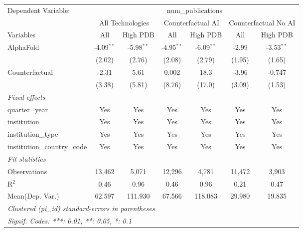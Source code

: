\begingroup
\centering
\begin{tabular}{lcccccc}
   \tabularnewline \midrule \midrule
   Dependent Variable: & \multicolumn{6}{c}{num\_publications}\\
 & \multicolumn{2}{c}{All Technologies} & \multicolumn{2}{c}{Counterfactual AI} & \multicolumn{2}{c}{Counterfactual No AI} \\
\cmidrule(lr){1-1}\cmidrule(lr){2-3} \cmidrule(lr){4-5} \cmidrule(lr){6-7}
Variables & \multicolumn{1}{c}{All} & \multicolumn{1}{c}{High PDB} & \multicolumn{1}{c}{All} & \multicolumn{1}{c}{High PDB} & \multicolumn{1}{c}{All} & \multicolumn{1}{c}{High PDB} \\
\cmidrule(lr){1-1}\cmidrule(lr){2-2} \cmidrule(lr){3-3} \cmidrule(lr){4-4} \cmidrule(lr){5-5} \cmidrule(lr){6-6} \cmidrule(lr){7-7}
   AlphaFold                    & -4.09$^{**}$ & -5.98$^{**}$ & -4.95$^{**}$ & -6.09$^{**}$ & -2.99  & -3.53$^{**}$\\   
                                & (2.02)       & (2.76)       & (2.08)       & (2.79)       & (1.95) & (1.65)\\   
   Counterfactual               & -2.31        & 5.61         & 0.002        & 18.3         & -3.96  & -0.747\\   
                                & (3.38)       & (5.81)       & (8.76)       & (17.0)       & (3.09) & (1.53)\\   
   \midrule
   \emph{Fixed-effects}\\
   quarter\_year                & Yes          & Yes          & Yes          & Yes          & Yes    & Yes\\  
   institution                  & Yes          & Yes          & Yes          & Yes          & Yes    & Yes\\  
   institution\_type            & Yes          & Yes          & Yes          & Yes          & Yes    & Yes\\  
   institution\_country\_code   & Yes          & Yes          & Yes          & Yes          & Yes    & Yes\\  
   \midrule
   \emph{Fit statistics}\\
   Observations                 & 13,462       & 5,071        & 12,296       & 4,781        & 11,472 & 3,903\\  
   R$^2$                        & 0.46         & 0.96         & 0.46         & 0.96         & 0.21   & 0.47\\  
Mean(Dep. Var.) & 62.597 & 111.930 & 67.566 & 118.083 & 29.980 & 19.835 \\
   \midrule \midrule
   \multicolumn{7}{l}{\emph{Clustered (pi\_id) standard-errors in parentheses}}\\
   \multicolumn{7}{l}{\emph{Signif. Codes: ***: 0.01, **: 0.05, *: 0.1}}\\
\end{tabular}
\par\endgroup
